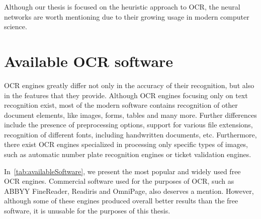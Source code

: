 Although our thesis is focused on the heuristic approach to OCR, the neural networks are worth mentioning due to their growing usage in modern computer science.

\section{Available OCR software}

OCR engines greatly differ not only in the accuracy of their recognition, but also in the features that they provide. Although OCR engines focusing only on text recognition exist, most of the modern software contains recognition of other document elements, like images, forms, tables and many more. Further differences include the presence of preprocessing options, support for various file extensions, recognition of different fonts, including handwritten documents, etc. Furthermore, there exist OCR engines specialized in processing only specific types of images, such as automatic number plate recognition engines or ticket validation engines.

In~\cref{tab:availableSoftware}, we present the most popular and widely used free OCR engines. Commercial software used for the purposes of OCR, such as ABBYY FineReader, Readiris and OmniPage, also deserves a mention. However, although some of these engines produced overall better results than the free software, it is unusable for the purposes of this thesis.


